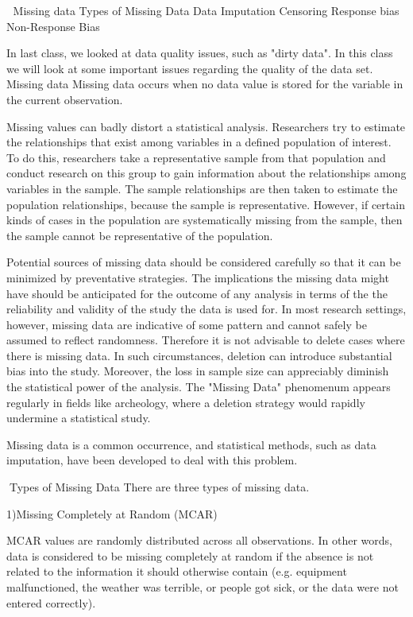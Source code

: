 

Missing data
Types of Missing Data
Data Imputation
Censoring
Response bias
Non-Response Bias

In last class, we looked at data quality issues, such as "dirty data". In this class we will look at some important issues regarding the quality of the data set.
Missing data
Missing data occurs when no data value is stored for the variable in the current observation. 

Missing values can badly distort a statistical analysis. Researchers try to estimate the relationships that exist among variables in a defined population of interest. To do this, researchers take a representative sample from that population and conduct research on this group to gain information about the relationships among variables in the sample. 
The sample relationships are then taken to estimate the population relationships, because the sample is representative. However, if certain kinds of cases in the population are systematically missing from the sample, then the sample cannot be representative of the population.

Potential sources of missing data should be considered carefully so that it can be minimized by preventative strategies. 
The implications the missing data might have should be anticipated for the outcome of any analysis in terms of the the reliability and validity of the study the data is used for.
In most research settings, however, missing data are indicative of some pattern and cannot safely be assumed to reflect randomness. Therefore it is not advisable to delete cases where there is missing data. 
In such circumstances, deletion can introduce substantial bias into the study. Moreover, the loss in sample size can appreciably diminish the statistical power of the analysis. The "Missing Data" phenomenum appears regularly in fields like archeology, where a deletion strategy would rapidly undermine a statistical study. 

Missing data is a common occurrence, and statistical methods, such as data imputation, have been developed to deal with this problem. 

Types of Missing Data
There are three types of missing data.

1)Missing Completely at Random (MCAR)
			
MCAR values are randomly distributed across all observations. In other words, data is considered to be missing completely at random if the absence is not related to the information it should otherwise contain (e.g. equipment malfunctioned, the weather was terrible, or people got sick, or the data were not entered correctly). 

